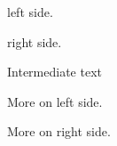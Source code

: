 \documentclass[12pt]{article}
\begin{document}
\begin{pages}
  \begin{Leftside}
    \beginnumbering
    \pstart
       left side. \lipsum[1-3]
    \pend
    \pstart
      \lipsum[4]
    \pend
    \endnumbering
  \end{Leftside}
  \begin{Rightside}
    \beginnumbering
    \pstart
       right side.\lipsum[1-3]
    \pend
    \pstart
      \lipsum[4]
    \pend
    \endnumbering
  \end{Rightside}
\end{pages}
\Pages

Intermediate text
\begin{pages}
  \begin{Leftside}
    \beginnumbering
    \pstart
      More on  left side. \lipsum[1-3] %
    \pend
    \pstart
      \lipsum[4]
    \pend
    \endnumbering
  \end{Leftside}
  \begin{Rightside}
    \beginnumbering
    \pstart
      More on  right side. \lipsum[1-3]
    \pend
    \pstart
      \lipsum[4]
    \pend
    \endnumbering
  \end{Rightside}
\end{pages}
\Pages
\end{document}
